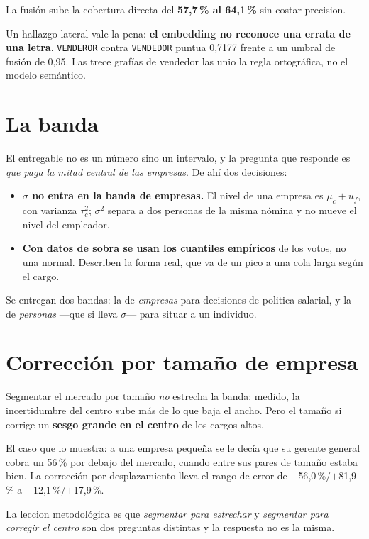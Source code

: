 \documentclass[12pt,a4paper]{report}
\newcommand{\cargo}[1]{\texttt{#1}}
\begin{document}
La fusión sube la cobertura directa del \textbf{57,7\,\% al 64,1\,\%} sin costar
precision.

Un hallazgo lateral vale la pena: \textbf{el embedding no reconoce una errata de
una letra}. \cargo{VENDEROR} contra \cargo{VENDEDOR} puntua 0,7177 frente a un
umbral de fusión de 0,95. Las trece grafías de vendedor las unio la regla
ortográfica, no el modelo semántico.

\section{La banda}

El entregable no es un número sino un intervalo, y la pregunta que responde es
\emph{que paga la mitad central de las empresas}. De ahí dos decisiones:

\begin{itemize}[nosep]
  \item \textbf{$\sigma$ no entra en la banda de empresas.} El nivel de una
        empresa es $\mu_c + u_f$, con varianza $\tau_c^2$; $\sigma^2$ separa a dos
        personas de la misma nómina y no mueve el nivel del empleador.
  \item \textbf{Con datos de sobra se usan los cuantiles empíricos} de los votos,
        no una normal. Describen la forma real, que va de un pico a una cola larga
        según el cargo.
\end{itemize}

Se entregan dos bandas: la de \emph{empresas} para decisiones de politica
salarial, y la de \emph{personas} ---que si lleva $\sigma$--- para situar a un
individuo.

\section{Corrección por tamaño de empresa}

Segmentar el mercado por tamaño \emph{no} estrecha la banda: medido, la
incertidumbre del centro sube más de lo que baja el ancho. Pero el tamaño si
corrige un \textbf{sesgo grande en el centro} de los cargos altos.

El caso que lo muestra: a una empresa pequeña se le decía que su gerente general
cobra un 56\,\% por debajo del mercado, cuando entre sus pares de tamaño estaba
bien. La corrección por desplazamiento lleva el rango de error de
$-$56{,}0\,\%/$+$81{,}9\,\% a $-$12{,}1\,\%/$+$17{,}9\,\%.

La leccion metodológica es que \emph{segmentar para estrechar} y \emph{segmentar
para corregir el centro} son dos preguntas distintas y la respuesta no es la
misma.
\end{document}
